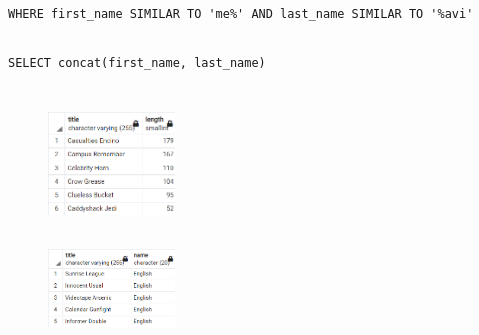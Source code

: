 \documentclass{article}
\begin{document}
\subsection{}
\begin{latin}
\begin{lstlisting}
WHERE first_name SIMILAR TO 'me%' AND last_name SIMILAR TO '%avi'
\end{lstlisting}
\end{latin}

\subsection{}
\begin{latin}
\begin{lstlisting}
SELECT concat(first_name, last_name)
\end{lstlisting}
\end{latin}

\section{}

\subsection{}
\begin{figure}[ht]
    \centering
    \includegraphics[width=0.3\textwidth]{figures/4-a.png}
    \caption
	{
	}
    \label{fig:fig1}
\end{figure}

\subsection{}
\begin{figure}[ht]
    \centering
    \includegraphics[width=0.3\textwidth]{figures/4-b.png}
    \caption
	{
	}
    \label{fig:fig1}
\end{figure}
\end{document}
